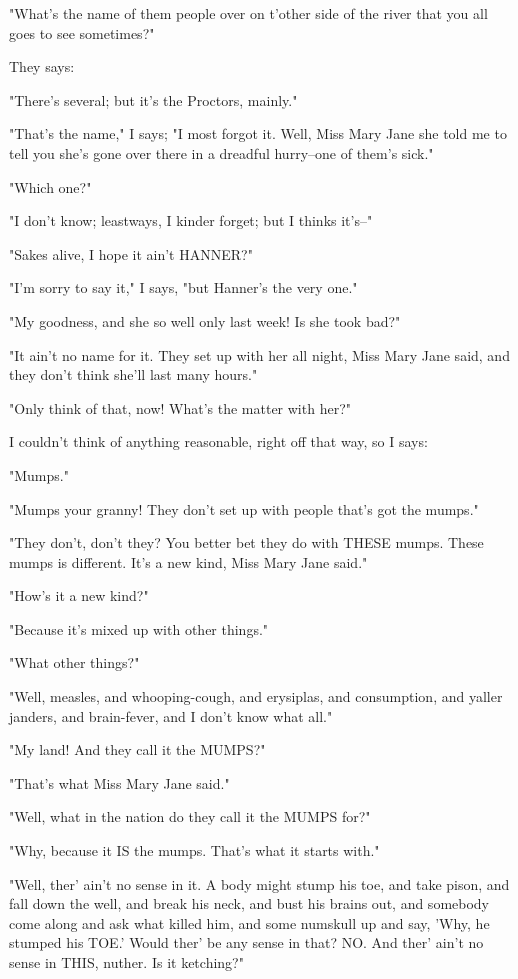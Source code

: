 "What's the name of them people over on t'other side of the river that
you all goes to see sometimes?"

They says:

"There's several; but it's the Proctors, mainly."

"That's the name," I says; "I most forgot it.  Well, Miss Mary Jane she
told me to tell you she's gone over there in a dreadful hurry--one of
them's sick."

"Which one?"

"I don't know; leastways, I kinder forget; but I thinks it's--"

"Sakes alive, I hope it ain't HANNER?"

"I'm sorry to say it," I says, "but Hanner's the very one."

"My goodness, and she so well only last week!  Is she took bad?"

"It ain't no name for it.  They set up with her all night, Miss Mary Jane
said, and they don't think she'll last many hours."

"Only think of that, now!  What's the matter with her?"

I couldn't think of anything reasonable, right off that way, so I says:

"Mumps."

"Mumps your granny!  They don't set up with people that's got the mumps."

"They don't, don't they?  You better bet they do with THESE mumps.  These
mumps is different.  It's a new kind, Miss Mary Jane said."

"How's it a new kind?"

"Because it's mixed up with other things."

"What other things?"

"Well, measles, and whooping-cough, and erysiplas, and consumption, and
yaller janders, and brain-fever, and I don't know what all."

"My land!  And they call it the MUMPS?"

"That's what Miss Mary Jane said."

"Well, what in the nation do they call it the MUMPS for?"

"Why, because it IS the mumps.  That's what it starts with."

"Well, ther' ain't no sense in it.  A body might stump his toe, and take
pison, and fall down the well, and break his neck, and bust his brains
out, and somebody come along and ask what killed him, and some numskull
up and say, 'Why, he stumped his TOE.'  Would ther' be any sense in that?
NO.  And ther' ain't no sense in THIS, nuther.  Is it ketching?"

